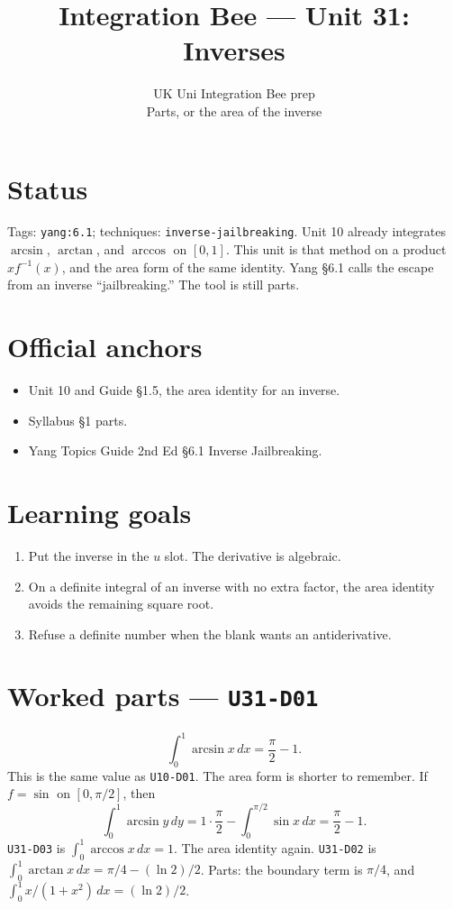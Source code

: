 
\title{Integration Bee --- Unit 31:\\ Inverses}
\author{UK Uni Integration Bee prep\\ Parts, or the area of the inverse}
\date{}

\maketitle
\section*{Status}
Tags: \texttt{yang:6.1}; techniques: \texttt{inverse-jailbreaking}.
Unit 10 already integrates $\arcsin$, $\arctan$, and $\arccos$ on $[0,1]$. This unit is that method on a product $x f^{-1}(x)$, and the area form of the same identity. Yang \S6.1 calls the escape from an inverse ``jailbreaking.'' The tool is still parts.
\section{Official anchors}
\begin{itemize}
\item Unit 10 and Guide \S1.5, the area identity for an inverse.
\item Syllabus \S1 parts.
\item Yang Topics Guide 2nd Ed \S6.1 Inverse Jailbreaking.
\end{itemize}
\section{Learning goals}
\begin{enumerate}
  \item Put the inverse in the $u$ slot. The derivative is algebraic.
  \item On a definite integral of an inverse with no extra factor, the area identity avoids the remaining square root.
  \item Refuse a definite number when the blank wants an antiderivative.
\end{enumerate}

\section{Worked parts --- \texttt{U31-D01}}
\[
\int_0^1\arcsin x\,dx=\frac\pi2-1.
\]
This is the same value as \texttt{U10-D01}. The area form is shorter to remember. If $f=\sin$ on $[0,\pi/2]$, then
\[
\int_0^1\arcsin y\,dy=1\cdot\frac\pi2-\int_0^{\pi/2}\sin x\,dx=\frac\pi2-1.
\]
\texttt{U31-D03} is $\int_0^1\arccos x\,dx=1$. The area identity again. \texttt{U31-D02} is $\int_0^1\arctan x\,dx=\pi/4-(\ln 2)/2$. Parts: the boundary term is $\pi/4$, and $\int_0^1 x/(1+x^2)\,dx=(\ln 2)/2$.

